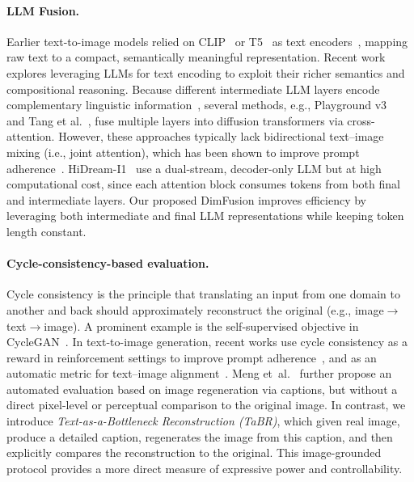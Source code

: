  

\paragraph{LLM Fusion.} 

Earlier text-to-image models relied on CLIP~\cite{radford2021learning} or T5~\cite{raffel2020exploring} as text encoders~\cite{rombach2022high,podell2023sdxl,saharia2022photorealistic}, mapping raw text to a compact, semantically meaningful representation. Recent work explores leveraging LLMs for text encoding to exploit their richer semantics and compositional reasoning. Because different intermediate LLM layers encode complementary linguistic information~\cite{durrani2020analyzing,dar2022analyzing,rombach2022high}, several methods, e.g., Playground v3~\cite{liu2024playground} and Tang et al.~\cite{tang2025exploring}, fuse multiple layers into diffusion transformers via cross-attention. However, these approaches typically lack bidirectional text–image mixing (i.e., joint attention), which has been shown to improve prompt adherence~\cite{esser2024scaling}. HiDream-I1~\cite{cai2025hidream} use a dual-stream, decoder-only LLM but at high computational cost, since each attention block consumes tokens from both final and intermediate layers. Our proposed DimFusion improves efficiency by leveraging both intermediate and final LLM representations while keeping token length constant.







\paragraph{Cycle-consistency-based evaluation.} 
Cycle consistency is the principle that translating an input from one domain to another and back should approximately reconstruct the original (e.g., image$\rightarrow$text$\rightarrow$image). A prominent example is the self-supervised objective in CycleGAN~\cite{zhu2017unpaired}. In text-to-image generation, recent works use cycle consistency as a reward in reinforcement settings to improve prompt adherence~\cite{meng2025image,bahng2025cycle}, and as an automatic metric for text–image alignment~\cite{huang2025image2text2image}. Meng et~al.~\cite{meng2025image} further propose an automated evaluation based on image regeneration via captions, but without a direct pixel-level or perceptual comparison to the original image. In contrast, we introduce \emph{Text-as-a-Bottleneck Reconstruction (TaBR)}, which given real image, produce a detailed caption, regenerates the image from this caption, and then explicitly compares the reconstruction to the original. This image-grounded protocol provides a more direct measure of expressive power and controllability.


